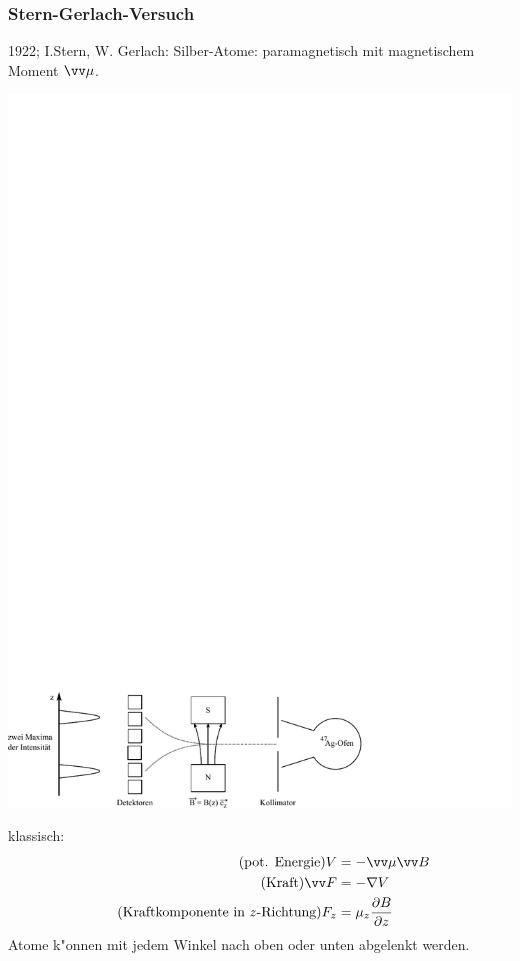 \documentclass[a4paper]{scrartcl}
\begin{document}
{\subsubsection*{Stern-Gerlach-Versuch}

1922; I.Stern, W. Gerlach: Silber-Atome: paramagnetisch mit magnetischem Moment $\vv \mu$.
\begin{center}
\includegraphics{056SternGerlach}
\end{center}
klassisch:
\begin{align*}
\tag{pot. Energie}  V & = - \vv \mu \vv B\\
\tag{Kraft}  \vv F & = - \nabla V \\
\tag{Kraftkomponente in $z$-Richtung} F_z & = \mu_z \frac {\partial B}{\partial z}
\end{align*}
Atome k"onnen mit jedem Winkel nach oben oder unten abgelenkt werden.

}
\end{document}
